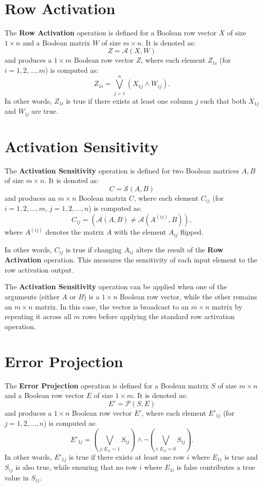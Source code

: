 \documentclass{article}
\begin{document}
\section{Row Activation}
The \textbf{Row Activation} operation is defined for a Boolean row vector \( X \) of size \( 1 \times n \) and a Boolean matrix \( W \) of size \( m \times n \). It is denoted as:
\[
Z = \mathcal{A}(X, W)
\]
and produces a \( 1 \times m \) Boolean row vector \( Z \), where each element \( Z_{1i} \) (for \( i = 1, 2, \dots, m \)) is computed as:
\[
Z_{1i} = \bigvee_{j=1}^{n} \left( X_{1j} \wedge W_{ij} \right).
\]
In other words, \( Z_{1i} \) is true if there exists at least one column \( j \) such that both \( X_{1j} \) and \( W_{ij} \) are true.

\section{Activation Sensitivity}
The \textbf{Activation Sensitivity} operation is defined for two Boolean matrices \( A, B \) of size \( m \times n \). It is denoted as:
\[
C = \mathcal{S}(A, B)
\]
and produces an \( m \times n \) Boolean matrix \( C \), where each element \( C_{ij} \) (for \( i = 1, 2, \dots, m \), \( j = 1, 2, \dots, n \)) is computed as:
\[
C_{ij} = \left( \mathcal{A}(A, B) \neq \mathcal{A}(A^{(ij)}, B) \right),
\]
where \( A^{(ij)} \) denotes the matrix \( A \) with the element \( A_{ij} \) flipped.

In other words, \( C_{ij} \) is true if changing \( A_{ij} \) alters the result of the \textbf{Row Activation} operation. This measures the sensitivity of each input element to the row activation output.

The \textbf{Activation Sensitivity} operation can be applied when one of the arguments (either \( A \) or \( B \)) is a \( 1 \times n \) Boolean row vector, while the other remains an \( m \times n \) matrix. In this case, the vector is broadcast to an \( m \times n \) matrix by repeating it across all \( m \) rows before applying the standard row activation operation.

\section{Error Projection}
The \textbf{Error Projection} operation is defined for a Boolean matrix \( S \) of size \( m \times n \) and a Boolean row vector \( E \) of size \( 1 \times m \). It is denoted as:
\[
E' = \mathcal{P}(S, E)
\]
and produces a \( 1 \times n \) Boolean row vector \( E' \), where each element \( E'_{1j} \) (for \( j = 1, 2, \dots, n \)) is computed as:
\[
E'_{1j} = \left( \bigvee_{j: E_{1i} = 1} S_{ij} \right) \wedge \neg \left( \bigvee_{i: E_{1i} = 0} S_{ij} \right).
\]
In other words, \( E'_{1j} \) is true if there exists at least one row \( i \) where \( E_{1i} \) is true and \( S_{ij} \) is also true, while ensuring that no row \( i \) where \( E_{1i} \) is false contributes a true value in \( S_{ij} \).
\end{document}
